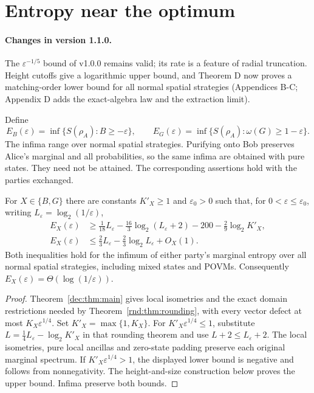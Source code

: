 \section{Entropy near the optimum}\label{sec:near}
\paragraph{Changes in version 1.1.0.} The $\varepsilon^{-1/5}$ bound of v1.0.0 remains valid; its rate is a feature of radial truncation. Height cutoffs give a logarithmic upper bound, and Theorem D now proves a matching-order lower bound for all normal spatial strategies (Appendices B-C; Appendix D adds the exact-algebra law and the extraction limit).

Define
\[
 E_B(\varepsilon)=\inf\{S(\rho_A):B\geq-\varepsilon\},\qquad
 E_G(\varepsilon)=\inf\{S(\rho_A):\omega(G)\geq1-\varepsilon\}.
\]
The infima range over normal spatial strategies. Purifying onto Bob preserves Alice's marginal and all probabilities, so the same infima are obtained with pure states. They need not be attained. The corresponding assertions hold with the parties exchanged.

\begin{theoremD}\label{thm:D}
For $X\in\{B,G\}$ there are constants $K'_X\ge1$ and $\varepsilon_0>0$ such that, for $0<\varepsilon\le\varepsilon_0$, writing $L_\varepsilon=\log_2(1/\varepsilon)$,
\begin{align*}
 E_X(\varepsilon)&\ge\frac1{18}L_\varepsilon
 -\frac{16}{3}\log_2(L_\varepsilon+2)-200-\frac29\log_2K'_X,\\
 E_X(\varepsilon)&\le\frac23L_\varepsilon
 -\frac23\log_2L_\varepsilon+O_X(1).
\end{align*}
Both inequalities hold for the infimum of either party's marginal entropy over all normal spatial strategies, including mixed states and POVMs. Consequently $E_X(\varepsilon)=\Theta(\log(1/\varepsilon))$.
\end{theoremD}
\begin{proof}
Theorem~\ref{dec:thm:main} gives local isometries and the exact domain restrictions needed by Theorem~\ref{rnd:thm:rounding}, with every vector defect at most $K_X\varepsilon^{1/4}$. Set $K'_X=\max\{1,K_X\}$. For $K'_X\varepsilon^{1/4}\le1$, substitute $L=\tfrac14L_\varepsilon-\log_2K'_X$ in that rounding theorem and use $L+2\le L_\varepsilon+2$. The local isometries, pure local ancillas and zero-state padding preserve each original marginal spectrum. If $K'_X\varepsilon^{1/4}>1$, the displayed lower bound is negative and follows from nonnegativity. The height-and-size construction below proves the upper bound. Infima preserve both bounds.
\end{proof}


